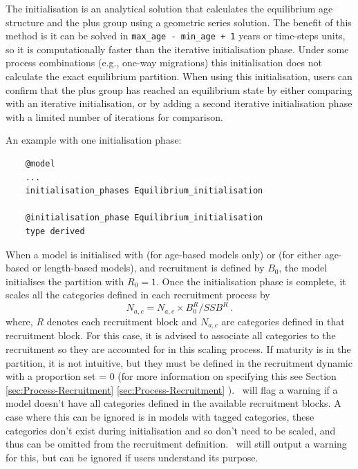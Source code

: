 The  initialisation is an analytical solution that calculates the equilibrium age structure and the plus group using a geometric series solution. The benefit of this method is it can be solved in \texttt{max\_age - min\_age + 1} years or time-steps units, so it is computationally faster than the iterative initialisation phase. Under some process combinations (e.g., one-way migrations) this initialisation does not calculate the exact equilibrium partition. When using this initialisation, users can confirm that the plus group has reached an equilibrium state by either comparing with an iterative initialisation, or by adding a second iterative initialisation phase with a limited number of iterations for comparison.

An example with one initialisation phase:

{\small{\begin{verbatim}
	@model
	...
	initialisation_phases Equilibrium_initialisation

	@initialisation_phase Equilibrium_initialisation
	type derived
\end{verbatim}}}
\fi

When a model is initialised with  (for age-based models only) or  (for either age-based or length-based models),  and recruitment is defined by \(B_0\), the model initialises the partition with \(R_0 = 1\). Once the initialisation phase is complete, it scales all the categories defined in each recruitment process by
\[
N_{a,c}  = N_{a,c} \times B_0^R / SSB^R  \ .
\]
where, \(R\) denotes each recruitment block and \(N_{a,c}\) are categories defined in that recruitment block. For this case, it is advised to associate all categories to the recruitment so they are accounted for in this scaling process. If maturity is in the partition, it is not intuitive, but they must be defined in the recruitment dynamic with a proportion set = 0 (for more information on specifying this see Section 
\ifAgeBased \ref{sec:Process-Recruitment} \else \ref{sec:Process-Recruitment} \fi). \CNAME\ will flag a warning if a model doesn't have all categories defined in the available recruitment blocks. A case where this can be ignored is in models with tagged categories, these categories don't exist during initialisation and so don't need to be scaled, and thus can be omitted from the recruitment definition. \CNAME\ will still output a warning for this, but can be ignored if users understand its purpose.

\ifAgeBased
\paragraph{}\label{sec:InitialisationPhase-Cinitial} 

